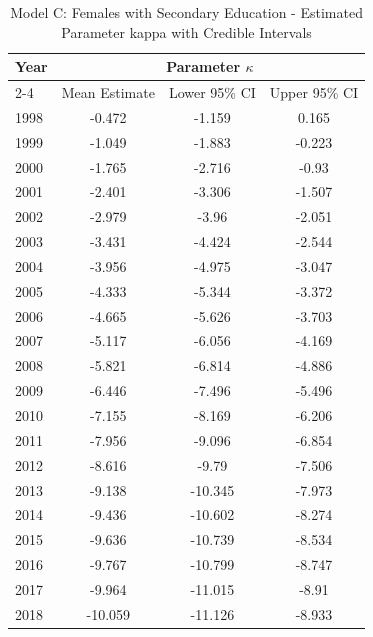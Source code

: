 \begin{landscape}
\begin{table}[htbp]
\centering
\caption{Model C: Females with Secondary Education - Estimated Parameter kappa  with Credible Intervals}
\label{tab:parameters_k19}
\begin{tabular}{@{}lccc@{}}
\toprule
Year & \multicolumn{3}{c}{Parameter \(\kappa\)} \\
\cmidrule(lr){2-4}
      & Mean Estimate & Lower 95\% CI & Upper 95\% CI \\
\midrule
1998 & -0.472 & -1.159 & 0.165 \\
1999 & -1.049 & -1.883 & -0.223 \\
2000 & -1.765 & -2.716 & -0.93 \\
2001 & -2.401 & -3.306 & -1.507 \\
2002 & -2.979 & -3.96 & -2.051 \\
2003 & -3.431 & -4.424 & -2.544 \\
2004 & -3.956 & -4.975 & -3.047 \\
2005 & -4.333 & -5.344 & -3.372 \\
2006 & -4.665 & -5.626 & -3.703 \\
2007 & -5.117 & -6.056 & -4.169 \\
2008 & -5.821 & -6.814 & -4.886 \\
2009 & -6.446 & -7.496 & -5.496 \\
2010 & -7.155 & -8.169 & -6.206 \\
2011 & -7.956 & -9.096 & -6.854 \\
2012 & -8.616 & -9.79 & -7.506 \\
2013 & -9.138 & -10.345 & -7.973 \\
2014 & -9.436 & -10.602 & -8.274 \\
2015 & -9.636 & -10.739 & -8.534 \\
2016 & -9.767 & -10.799 & -8.747 \\
2017 & -9.964 & -11.015 & -8.91 \\
2018 & -10.059 & -11.126 & -8.933 \\
\bottomrule
\end{tabular}
\end{table}
\end{landscape}